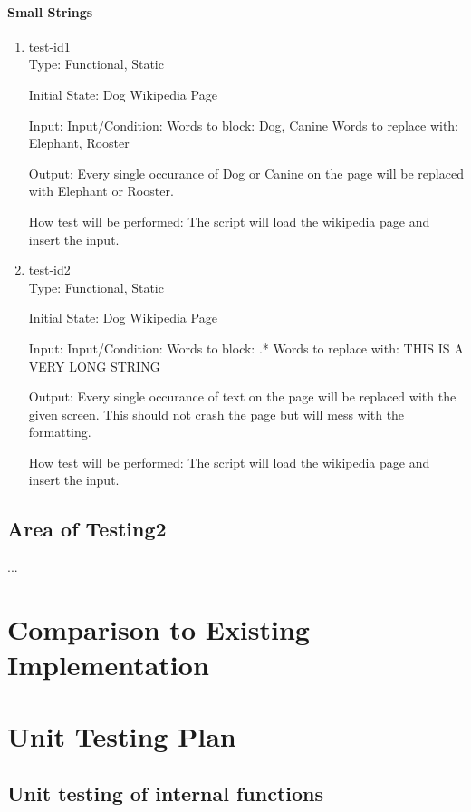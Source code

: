 \documentclass[12pt, titlepage]{article}
\begin{document}
\paragraph{Small Strings}
\begin{enumerate}
\item{test-id1\\}
Type: Functional, Static
					
Initial State: Dog Wikipedia Page
					
Input: Input/Condition: Words to block: Dog, Canine
Words to replace with: Elephant, Rooster
					
Output: Every single occurance of Dog or Canine on the page will be replaced with Elephant or Rooster.
					
How test will be performed: The script will load the wikipedia page and insert the input. 
					
\item{test-id2\\}
Type: Functional, Static
					
Initial State: Dog Wikipedia Page
					
Input: Input/Condition: Words to block: .*
Words to replace with: THIS IS A VERY LONG STRING

Output: Every single occurance of text on the page will be replaced with the given screen. This should not crash the page but will mess with the formatting.
					
How test will be performed: The script will load the wikipedia page and insert the input.
\end{enumerate}
\subsection{Area of Testing2}
...
	
\section{Comparison to Existing Implementation}	
				
\section{Unit Testing Plan}
		
\subsection{Unit testing of internal functions}
		
\end{document}
